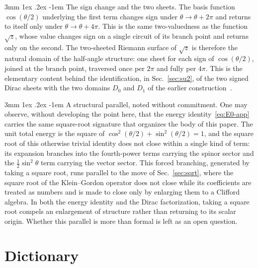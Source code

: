 \documentclass[%
 reprint, amsmath,amssymb, aps, prb, ]{revtex4-2}
\makeatletter
\numberwithin{equation}{section}
\renewcommand\paragraph{%
  \@startsection{paragraph}{4}{\z@}%
    {3mm \@plus 1ex \@minus .2ex}%
    {-1em}%
    {\normalfont\normalsize\itshape}}
\newcommand{\iphase}{\theta}  %
\makeatother
\begin{document}
\paragraph{The sign change and the two sheets.}
The basis function $\cos(\iphase/2)$ underlying the first term changes sign under $\iphase\to\iphase+2\pi$ and returns to itself only under $\iphase\to\iphase+4\pi$. This is the same two-valuedness as the function $\sqrt{z}$, whose value changes sign on a single circuit of its branch point and returns only on the second. The two-sheeted Riemann surface of $\sqrt{z}$ is therefore the natural domain of the half-angle structure: one sheet for each sign of $\cos(\iphase/2)$, joined at the branch point, traversed once per $2\pi$ and fully per $4\pi$. This is the elementary content behind the identification, in Sec.~\ref{sec:su2}, of the two signed Dirac sheets with the two domains $D_{0}$ and $D_{1}$ of the earlier construction~\cite{hanamura03}.

\paragraph{A structural parallel, noted without commitment.}
One may observe, without developing the point here, that the energy identity~\eqref{eq:E0-app} carries the same square-root signature that organizes the body of this paper. The unit total energy is the square of $\cos^{2}(\iphase/2)+\sin^{2}(\iphase/2)=1$, and the square root of this otherwise trivial identity does not close within a single kind of term: its expansion branches into the fourth-power terms carrying the spinor sector and the $\tfrac12\sin^{2}\iphase$ term carrying the vector sector. This forced branching, generated by taking a square root, runs parallel to the move of Sec.~\ref{sec:sqrt}, where the square root of the Klein--Gordon operator does not close while its coefficients are treated as numbers and is made to close only by enlarging them to a Clifford algebra. In both the energy identity and the Dirac factorization, taking a square root compels an enlargement of structure rather than returning to its scalar origin. Whether this parallel is more than formal is left as an open question.

\section{Dictionary}
\label{app:dictionary}
\end{document}
